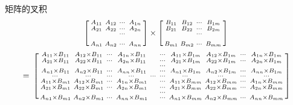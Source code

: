 \documentclass[twoside,a4paper,CCT]{cctart}   %
\begin{document}
\begin{define}
矩阵的叉积
\\
   $$\begin{bmatrix}\begin{smallmatrix}
  A_{11}& A_{12}& \cdots&A_{1n}\\
  A_{21}& A_{22}& \cdots&A_{2n}\\
  & & \cdots&\\&\\
  A_{n1}& A_{n2}& \cdots&A_{nn}\\
 \end{smallmatrix}\end{bmatrix}
 \times
 \begin{bmatrix}\begin{smallmatrix}
  B_{11}& B_{12}& \cdots&B_{1m}\\
  B_{21}& B_{22}& \cdots&B_{2m}\\
  & & \cdots&\\&\\
  B_{m1}& B_{m2}& \cdots&B_{mm}\\
 \end{smallmatrix}\end{bmatrix}\\$$
 $$=\\
 \begin{bmatrix}\begin{smallmatrix}
  A_{11} \times B_{11}& A_{12} \times B_{11}& \cdots&A_{1n} \times B_{11}
  & & \cdots&
  A_{11} \times B_{1m}& A_{12} \times B_{1m}& \cdots&A_{1n} \times B_{1m}\\
  A_{21} \times B_{11}& A_{22} \times B_{11}& \cdots&A_{2n} \times B_{11}
  & & \cdots&
  A_{21} \times B_{1m}& A_{22} \times B_{1m}& \cdots&A_{2n} \times B_{1m}\\
  & & & & &\cdots& &\\
  A_{n1} \times B_{11}& A_{n2} \times B_{11}& \cdots&A_{nn} \times B_{11}
  & & \cdots&
  A_{n1} \times B_{1m}& A_{n2} \times B_{1m}& \cdots&A_{nn} \times B_{1m}\\
  \cdots &\cdots &\cdots &\cdots &\cdots  &\cdots  &\cdots &\cdots  &\cdots &\cdots \\
  A_{11} \times B_{m1}& A_{12} \times B_{m1}& \cdots&A_{1n} \times B_{m1}
  & & \cdots&
  A_{11} \times B_{mm}& A_{12} \times B_{mm}& \cdots&A_{1n} \times B_{mm}\\
  A_{21} \times B_{m1}& A_{22} \times B_{m1}& \cdots&A_{2n} \times B_{m1}
  & & \cdots&
  A_{21} \times B_{mm}& A_{22} \times B_{mm}& \cdots&A_{2n} \times B_{mm}\\
  & & & & &\cdots& &\\
  A_{n1} \times B_{m1}& A_{n2} \times B_{m1}& \cdots&A_{nn} \times B_{m1}
  & & \cdots&
  A_{n1} \times B_{mm}& A_{n2} \times B_{mm}& \cdots&A_{nn} \times B_{mm}\\
  \end{smallmatrix}\end{bmatrix}$$
\end{define}
\end{document}
